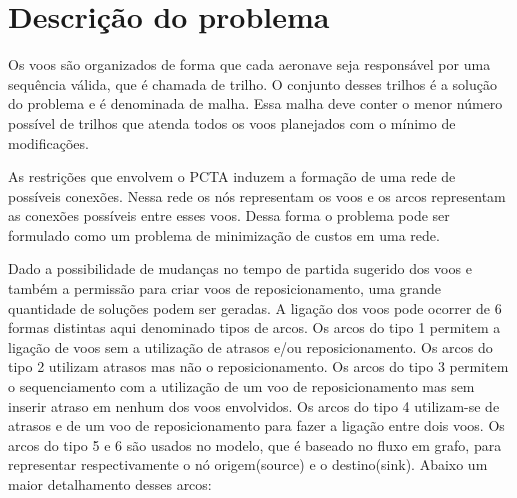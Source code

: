 \chapter{Descrição do problema}\label{cap:descprob}

  Os voos são organizados de forma que cada aeronave seja responsável por uma sequência válida, que é chamada de trilho.  O conjunto desses trilhos é a solução do problema e é denominada de malha. Essa malha deve conter o menor número possível de trilhos que atenda todos os voos planejados com o mínimo de modificações.
  
  As restrições que envolvem o PCTA induzem a formação de uma rede de possíveis conexões. Nessa rede os nós representam os voos e os arcos representam as conexões possíveis entre esses voos. Dessa forma o problema pode ser formulado como um problema de minimização de custos em uma rede.
  
  Dado a possibilidade de mudanças no tempo de partida sugerido dos voos e também a permissão para criar voos de
reposicionamento, uma grande quantidade de soluções podem ser geradas. A ligação dos voos pode ocorrer de 6 formas
distintas aqui denominado tipos de arcos. Os arcos do tipo 1 permitem a ligação de voos sem a utilização de atrasos e/ou
reposicionamento. Os arcos do tipo 2 utilizam atrasos mas não o reposicionamento. Os arcos do tipo 3 permitem o
sequenciamento com a utilização de um voo de reposicionamento mas sem inserir atraso em nenhum dos voos envolvidos. Os
arcos do tipo 4 utilizam-se de atrasos e de um voo de reposicionamento para fazer a ligação entre dois voos. Os arcos do tipo 5
e 6 são usados no modelo, que é baseado no fluxo em grafo, para representar respectivamente o nó origem(source) e o
destino(sink). Abaixo um maior detalhamento desses arcos:

